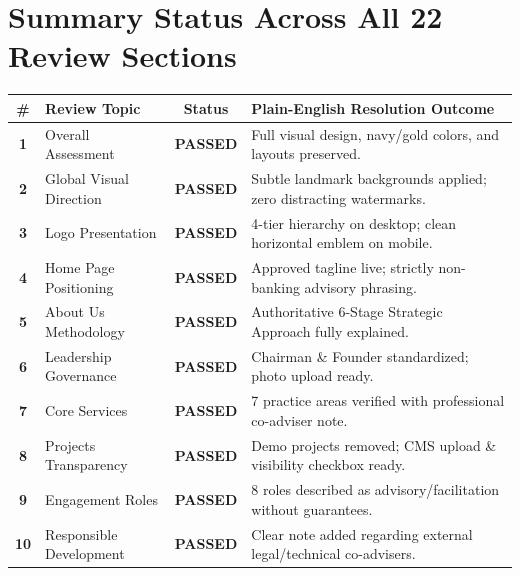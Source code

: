 \documentclass[11pt,a4paper]{article}
\begin{document}
\vspace{0.4cm}

\section{Summary Status Across All 22 Review Sections}

\begin{center}
\small
\begin{tabularx}{\textwidth}{c l c X}
    \toprule
    \textbf{\#} & \textbf{Review Topic} & \textbf{Status} & \textbf{Plain-English Resolution Outcome} \\
    \midrule
    \textbf{1} & Overall Assessment & \textbf{\color{HGGGreen}PASSED} & Full visual design, navy/gold colors, and layouts preserved. \\
    \textbf{2} & Global Visual Direction & \textbf{\color{HGGGreen}PASSED} & Subtle landmark backgrounds applied; zero distracting watermarks. \\
    \textbf{3} & Logo Presentation & \textbf{\color{HGGGreen}PASSED} & 4-tier hierarchy on desktop; clean horizontal emblem on mobile. \\
    \textbf{4} & Home Page Positioning & \textbf{\color{HGGGreen}PASSED} & Approved tagline live; strictly non-banking advisory phrasing. \\
    \textbf{5} & About Us Methodology & \textbf{\color{HGGGreen}PASSED} & Authoritative 6-Stage Strategic Approach fully explained. \\
    \textbf{6} & Leadership Governance & \textbf{\color{HGGGreen}PASSED} & Chairman \& Founder standardized; photo upload ready. \\
    \textbf{7} & Core Services & \textbf{\color{HGGGreen}PASSED} & 7 practice areas verified with professional co-adviser note. \\
    \textbf{8} & Projects Transparency & \textbf{\color{HGGGreen}PASSED} & Demo projects removed; CMS upload \& visibility checkbox ready. \\
    \textbf{9} & Engagement Roles & \textbf{\color{HGGGreen}PASSED} & 8 roles described as advisory/facilitation without guarantees. \\
    \textbf{10} & Responsible Development & \textbf{\color{HGGGreen}PASSED} & Clear note added regarding external legal/technical co-advisers. \\

\end{tabularx}
\end{center}
\end{document}
